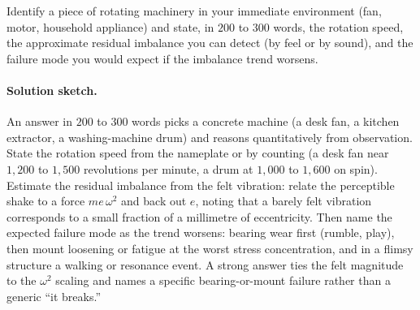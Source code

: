 \begin{exercise}
Identify a piece of rotating machinery in your immediate environment
(fan, motor, household appliance) and state, in $200$ to $300$ words,
the rotation speed, the approximate residual imbalance you can
detect (by feel or by sound), and the failure mode you would expect
if the imbalance trend worsens.
\paragraph{Solution sketch.} An answer in $200$ to $300$ words picks a
concrete machine (a desk fan, a kitchen extractor, a washing-machine
drum) and reasons quantitatively from observation. State the rotation
speed from the nameplate or by counting (a desk fan near $1{,}200$ to
$1{,}500$ revolutions per minute, a drum at $1{,}000$ to $1{,}600$ on
spin). Estimate the residual imbalance from the felt vibration:
relate the perceptible shake to a force $m e\,\omega^{2}$ and back out
$e$, noting that a barely felt vibration corresponds to a small
fraction of a millimetre of eccentricity. Then name the expected
failure mode as the trend worsens: bearing wear first (rumble, play),
then mount loosening or fatigue at the worst stress concentration, and
in a flimsy structure a walking or resonance event. A strong answer
ties the felt magnitude to the $\omega^{2}$ scaling and names a
specific bearing-or-mount failure rather than a generic ``it breaks.''
\end{exercise}
